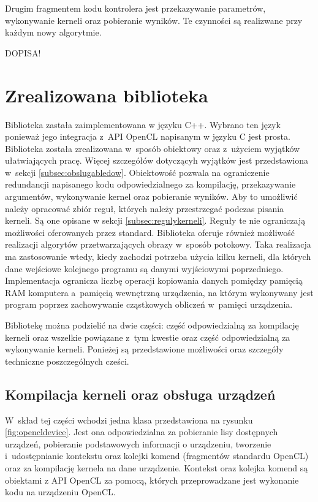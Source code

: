 Drugim fragmentem kodu kontrolera jest przekazywanie parametrów, wykonywanie kerneli oraz pobieranie wyników. Te czynności są realizwane przy każdym nowy algorytmie.

DOPISA!

\section{Zrealizowana biblioteka}  
\label{sec:biblioteka}

Biblioteka zastała zaimplementowana w języku C++. Wybrano ten język ponieważ jego integracja z~API OpenCL napisanym w języku C jest prosta. Biblioteka została zrealizowana w~sposób obiektowy oraz z~użyciem wyjątków ułatwiających pracę. Więcej szczegółów dotyczącyh wyjątków jest przedstawiona w~sekcji \ref{subsec:obslugabledow}. Obiektowość pozwala na ograniczenie redundancji napisanego kodu odpowiedzialnego za kompilację, przekazywanie argumentów, wykonywanie kernel oraz pobieranie wyników. Aby to umożliwić należy opracować zbiór reguł, których należy przestrzegać podczas pisania kerneli. Są one opisane w sekcji \ref{subsec:regulykerneli}. Reguły te nie ograniczają możliwości oferowanych przez standard. Biblioteka oferuje również możliwość realizacji algorytów przetwarzających obrazy w~sposób potokowy. Taka realizacja ma zastosowanie wtedy, kiedy zachodzi potrzeba użycia kilku kerneli, dla których dane wejściowe kolejnego programu są danymi wyjściowymi poprzedniego. Implementacja  ogranicza liczbę operacji kopiowania danych pomiędzy pamięcią RAM komputera a~pamięcią wewnętrzną urządzenia, na którym wykonywany jest program poprzez zachowywanie cząstkowych obliczeń w~pamięci urządzenia.

Bibliotekę można podzielić na dwie części: część odpowiedzialną za kompilację kerneli oraz wszelkie powiązane z~tym kwestie oraz część odpowiedzialną za wykonywanie kerneli.
Ponieżej są przedstawione możliwości oraz szczegóły techniczne poszczególnych cześci.

\subsection{Kompilacja kerneli oraz obsługa urządzeń}
\label{subsec:kompilacjakerneli}
W~skład tej części wchodzi jedna klasa przedstawiona na rysunku \ref{fig:opencldevice}. Jest ona odpowiedzialna za pobieranie lisy dostępnych urządzeń, pobieranie podstawowych informacji o urządzeniu, tworzenie i~udostępnianie kontekstu oraz kolejki komend (fragmentów standardu OpenCL) oraz za kompilację kernela na dane urządzenie. Kontekst oraz kolejka komend są obiektami z API OpenCL za pomocą, których przeprowadzane jest wykonanie kodu na urządzeniu OpenCL.


